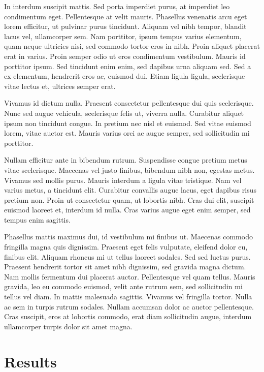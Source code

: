 \documentclass[conference]{IEEEtran}
\begin{document}
In interdum suscipit mattis. Sed porta imperdiet purus, at imperdiet leo condimentum eget. Pellentesque at velit mauris. Phasellus venenatis arcu eget lorem efficitur, ut pulvinar purus tincidunt. Aliquam vel nibh tempor, blandit lacus vel, ullamcorper sem. Nam porttitor, ipsum tempus varius elementum, quam neque ultricies nisi, sed commodo tortor eros in nibh. Proin aliquet placerat erat in varius. Proin semper odio ut eros condimentum vestibulum. Mauris id porttitor ipsum. Sed tincidunt enim enim, sed dapibus urna aliquam sed. Sed a ex elementum, hendrerit eros ac, euismod dui. Etiam ligula ligula, scelerisque vitae lectus et, ultrices semper erat.

Vivamus id dictum nulla. Praesent consectetur pellentesque dui quis scelerisque. Nunc sed augue vehicula, scelerisque felis ut, viverra nulla. Curabitur aliquet ipsum non tincidunt congue. In pretium nec nisl et euismod. Sed vitae euismod lorem, vitae auctor est. Mauris varius orci ac augue semper, sed sollicitudin mi porttitor.

Nullam efficitur ante in bibendum rutrum. Suspendisse congue pretium metus vitae scelerisque. Maecenas vel justo finibus, bibendum nibh non, egestas metus. Vivamus sed mollis purus. Mauris interdum a ligula vitae tristique. Nam vel varius metus, a tincidunt elit. Curabitur convallis augue lacus, eget dapibus risus pretium non. Proin ut consectetur quam, ut lobortis nibh. Cras dui elit, suscipit euismod laoreet et, interdum id nulla. Cras varius augue eget enim semper, sed tempus enim sagittis.

Phasellus mattis maximus dui, id vestibulum mi finibus ut. Maecenas commodo fringilla magna quis dignissim. Praesent eget felis vulputate, eleifend dolor eu, finibus elit. Aliquam rhoncus mi ut tellus laoreet sodales. Sed sed luctus purus. Praesent hendrerit tortor sit amet nibh dignissim, sed gravida magna dictum. Nam mollis fermentum dui placerat auctor. Pellentesque vel quam tellus. Mauris gravida, leo eu commodo euismod, velit ante rutrum sem, sed sollicitudin mi tellus vel diam. In mattis malesuada sagittis. Vivamus vel fringilla tortor. Nulla ac sem in turpis rutrum sodales. Nullam accumsan dolor ac auctor pellentesque. Cras suscipit, eros at lobortis commodo, erat diam sollicitudin augue, interdum ullamcorper turpis dolor sit amet magna. 

\section{Results}
\end{document}
